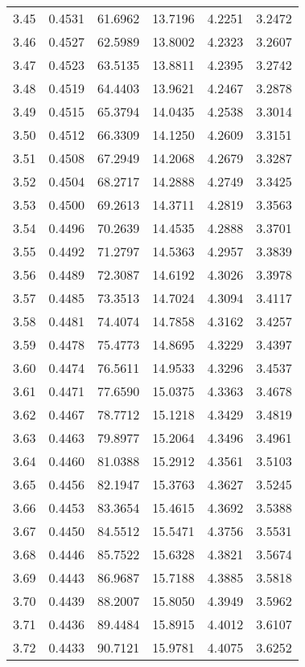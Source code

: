 \documentclass{article}
\begin{document}
\begin{longtable}{cccccc}
3.45 & 0.4531 & 61.6962 & 13.7196 & 4.2251 & 3.2472 \\
3.46 & 0.4527 & 62.5989 & 13.8002 & 4.2323 & 3.2607 \\
3.47 & 0.4523 & 63.5135 & 13.8811 & 4.2395 & 3.2742 \\
3.48 & 0.4519 & 64.4403 & 13.9621 & 4.2467 & 3.2878 \\
3.49 & 0.4515 & 65.3794 & 14.0435 & 4.2538 & 3.3014 \\
3.50 & 0.4512 & 66.3309 & 14.1250 & 4.2609 & 3.3151 \\
3.51 & 0.4508 & 67.2949 & 14.2068 & 4.2679 & 3.3287 \\
3.52 & 0.4504 & 68.2717 & 14.2888 & 4.2749 & 3.3425 \\
3.53 & 0.4500 & 69.2613 & 14.3711 & 4.2819 & 3.3563 \\
3.54 & 0.4496 & 70.2639 & 14.4535 & 4.2888 & 3.3701 \\
3.55 & 0.4492 & 71.2797 & 14.5363 & 4.2957 & 3.3839 \\
3.56 & 0.4489 & 72.3087 & 14.6192 & 4.3026 & 3.3978 \\
3.57 & 0.4485 & 73.3513 & 14.7024 & 4.3094 & 3.4117 \\
3.58 & 0.4481 & 74.4074 & 14.7858 & 4.3162 & 3.4257 \\
3.59 & 0.4478 & 75.4773 & 14.8695 & 4.3229 & 3.4397 \\
3.60 & 0.4474 & 76.5611 & 14.9533 & 4.3296 & 3.4537 \\
3.61 & 0.4471 & 77.6590 & 15.0375 & 4.3363 & 3.4678 \\
3.62 & 0.4467 & 78.7712 & 15.1218 & 4.3429 & 3.4819 \\
3.63 & 0.4463 & 79.8977 & 15.2064 & 4.3496 & 3.4961 \\
3.64 & 0.4460 & 81.0388 & 15.2912 & 4.3561 & 3.5103 \\
3.65 & 0.4456 & 82.1947 & 15.3763 & 4.3627 & 3.5245 \\
3.66 & 0.4453 & 83.3654 & 15.4615 & 4.3692 & 3.5388 \\
3.67 & 0.4450 & 84.5512 & 15.5471 & 4.3756 & 3.5531 \\
3.68 & 0.4446 & 85.7522 & 15.6328 & 4.3821 & 3.5674 \\
3.69 & 0.4443 & 86.9687 & 15.7188 & 4.3885 & 3.5818 \\
3.70 & 0.4439 & 88.2007 & 15.8050 & 4.3949 & 3.5962 \\
3.71 & 0.4436 & 89.4484 & 15.8915 & 4.4012 & 3.6107 \\
3.72 & 0.4433 & 90.7121 & 15.9781 & 4.4075 & 3.6252 \\

\end{longtable}
\end{document}
